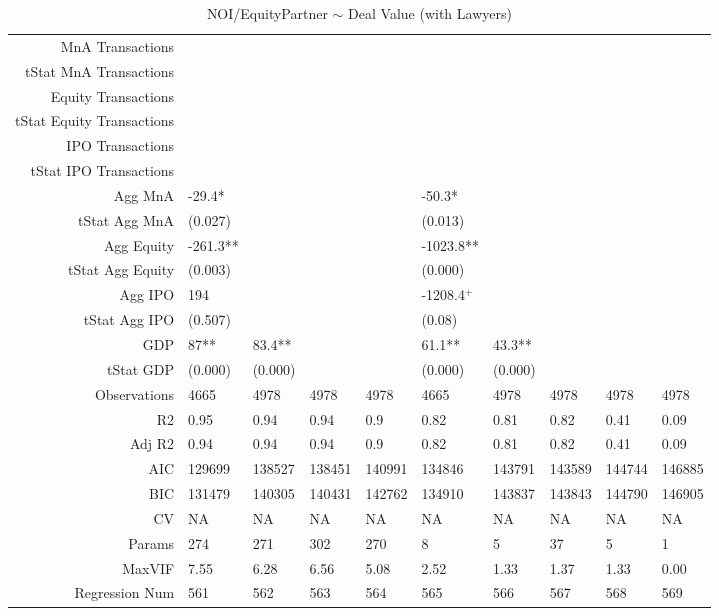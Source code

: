 \begin{table}[ht]
\begin{tabular}{rlllllllll}
  MnA Transactions &  &  &  &  &  &  &  &  &  \\ 
  tStat MnA Transactions &  &  &  &  &  &  &  &  &  \\ 
  Equity Transactions &  &  &  &  &  &  &  &  &  \\ 
  tStat Equity Transactions &  &  &  &  &  &  &  &  &  \\ 
  IPO Transactions &  &  &  &  &  &  &  &  &  \\ 
  tStat IPO Transactions &  &  &  &  &  &  &  &  &  \\ 
  Agg MnA & -29.4* &  &  &  & -50.3* &  &  &  &  \\ 
  tStat Agg MnA & (0.027) &  &  &  & (0.013) &  &  &  &  \\ 
  Agg Equity & -261.3** &  &  &  & -1023.8** &  &  &  &  \\ 
  tStat Agg Equity & (0.003) &  &  &  & (0.000) &  &  &  &  \\ 
  Agg IPO & 194 &  &  &  & -1208.4$^{+}$ &  &  &  &  \\ 
  tStat Agg IPO & (0.507) &  &  &  & (0.08) &  &  &  &  \\ 
  GDP & 87** & 83.4** &  &  & 61.1** & 43.3** &  &  &  \\ 
  tStat GDP & (0.000) & (0.000) &  &  & (0.000) & (0.000) &  &  &  \\ 
  Observations & 4665 & 4978 & 4978 & 4978 & 4665 & 4978 & 4978 & 4978 & 4978 \\ 
  R2 & 0.95 & 0.94 & 0.94 & 0.9 & 0.82 & 0.81 & 0.82 & 0.41 & 0.09 \\ 
  Adj R2 & 0.94 & 0.94 & 0.94 & 0.9 & 0.82 & 0.81 & 0.82 & 0.41 & 0.09 \\ 
  AIC & 129699 & 138527 & 138451 & 140991 & 134846 & 143791 & 143589 & 144744 & 146885 \\ 
  BIC & 131479 & 140305 & 140431 & 142762 & 134910 & 143837 & 143843 & 144790 & 146905 \\ 
  CV & NA & NA & NA & NA & NA & NA & NA & NA & NA \\ 
  Params & 274 & 271 & 302 & 270 & 8 & 5 & 37 & 5 & 1 \\ 
  MaxVIF & 7.55 & 6.28 & 6.56 & 5.08 & 2.52 & 1.33 & 1.37 & 1.33 & 0.00 \\ 
  Regression Num & 561 & 562 & 563 & 564 & 565 & 566 & 567 & 568 & 569 \\ 
   \hline
\end{tabular}
\caption{NOI/EquityPartner $\sim$ Deal Value (with Lawyers)} 
\end{table}
